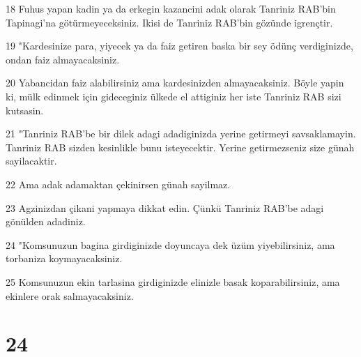 \par 18 Fuhus yapan kadin ya da erkegin kazancini adak olarak Tanriniz RAB'bin Tapinagi'na götürmeyeceksiniz. Ikisi de Tanriniz RAB'bin gözünde igrençtir.
\par 19 "Kardesinize para, yiyecek ya da faiz getiren baska bir sey ödünç verdiginizde, ondan faiz almayacaksiniz.
\par 20 Yabancidan faiz alabilirsiniz ama kardesinizden almayacaksiniz. Böyle yapin ki, mülk edinmek için gideceginiz ülkede el attiginiz her iste Tanriniz RAB sizi kutsasin.
\par 21 "Tanriniz RAB'be bir dilek adagi adadiginizda yerine getirmeyi savsaklamayin. Tanriniz RAB sizden kesinlikle bunu isteyecektir. Yerine getirmezseniz size günah sayilacaktir.
\par 22 Ama adak adamaktan çekinirsen günah sayilmaz.
\par 23 Agzinizdan çikani yapmaya dikkat edin. Çünkü Tanriniz RAB'be adagi gönülden adadiniz.
\par 24 "Komsunuzun bagina girdiginizde doyuncaya dek üzüm yiyebilirsiniz, ama torbaniza koymayacaksiniz.
\par 25 Komsunuzun ekin tarlasina girdiginizde elinizle basak koparabilirsiniz, ama ekinlere orak salmayacaksiniz.

\chapter{24}


